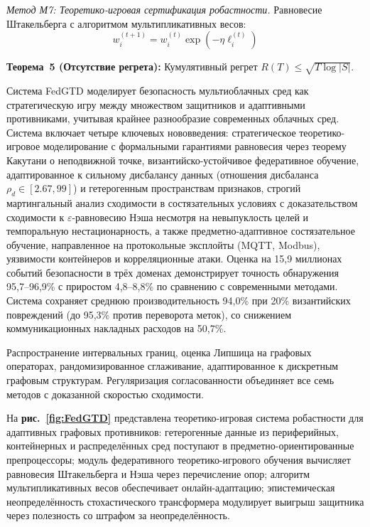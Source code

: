 \documentclass[12pt,a5paper]{article}
\begin{document}
\textit{Метод М7: Теоретико-игровая сертификация робастности.} Равновесие Штакельберга с алгоритмом мультипликативных весов:
\begin{equation}
w_i^{(t+1)} = w_i^{(t)} \exp(-\eta \ell_i^{(t)})
\end{equation}

\textbf{Теорема~5 (Отсутствие регрета):} Кумулятивный регрет $R(T) \leq \sqrt{T \log |S|}$.

Система FedGTD моделирует безопасность мультиоблачных сред как стратегическую игру между множеством защитников и адаптивными противниками, учитывая крайнее разнообразие современных облачных сред. Система включает четыре ключевых нововведения: стратегическое теоретико-игровое моделирование с формальными гарантиями равновесия через теорему Какутани о неподвижной точке, византийско-устойчивое федеративное обучение, адаптированное к сильному дисбалансу данных (отношения дисбаланса $\rho_d \in [2.67, 99]$) и гетерогенным пространствам признаков, строгий мартингальный анализ сходимости в состязательных условиях с доказательством сходимости к $\varepsilon$-равновесию Нэша несмотря на невыпуклость целей и темпоральную нестационарность, а также предметно-адаптивное состязательное обучение, направленное на протокольные эксплойты (MQTT, Modbus), уязвимости контейнеров и корреляционные атаки. Оценка на 15,9 миллионах событий безопасности в трёх доменах демонстрирует точность обнаружения 95,7--96,9\% с приростом 4,8--8,8\% по сравнению с современными методами. Система сохраняет среднюю производительность 94,0\% при 20\% византийских повреждений (до 95,3\% против переворота меток), со снижением коммуникационных накладных расходов на 50,7\%.

Распространение интервальных границ, оценка Липшица на графовых операторах, рандомизированное сглаживание, адаптированное к дискретным графовым структурам. Регуляризация согласованности объединяет все семь методов с доказанной скоростью сходимости.

На \textbf{рис.~\ref{fig:FedGTD}} представлена теоретико-игровая система робастности для адаптивных графовых противников: гетерогенные данные из периферийных, контейнерных и распределённых сред поступают в предметно-ориентированные препроцессоры; модуль федеративного теоретико-игрового обучения вычисляет равновесия Штакельберга и Нэша через перечисление опор; алгоритм мультипликативных весов обеспечивает онлайн-адаптацию; эпистемическая неопределённость стохастического трансформера модулирует выигрыш защитника через полезность со штрафом за неопределённость.
\end{document}
